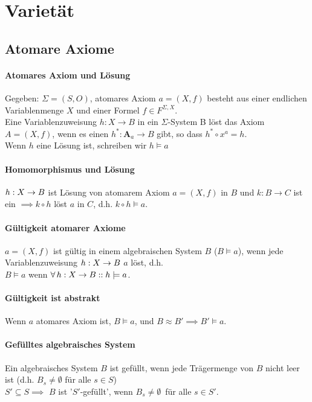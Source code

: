 \newpage

\section{Varietät}

\subsection{Atomare Axiome}

\paragraph{ Atomares Axiom und Lösung}
Gegeben: $\Sigma = (S,O)$, atomares Axiom $a = (X, f)$ besteht aus einer endlichen Variablenmenge $X$ und einer Formel $f \in F^{\Sigma, X}$. \\
Eine Variablenzuweisung $h: X \rightarrow B$ in ein $\Sigma$-System B löst das Axiom $A = (X, f)$, wenn es einen \homo $h^*: \mathbf{A}_a \rightarrow B$ gibt, so dass $h^* \circ x^a = h$. \\
Wenn $h$ eine Lösung ist, schreiben wir $h \models a$

\paragraph{ Homomorphismus und Lösung}

$h: X \rightarrow B$ ist Lösung von atomarem Axiom $a = (X,f)$ in $B$ und $k: B \rightarrow C$ ist ein \homo $\implies k \circ h$ löst $a$ in $C$, d.h. $k \circ h \models a$.


\paragraph{ Gültigkeit atomarer Axiome}

$a= (X,f) $ ist gültig in einem algebraischen System $B$ ($B \models a$), wenn jede Variablenzuweisung $h: X \rightarrow B$ $a$ löst, d.h. \\
$B \models a$ wenn $\forall \, h: X \rightarrow B :: h \models a$.

\paragraph{ Gültigkeit ist abstrakt}
Wenn $a$ atomares Axiom ist, $B \models a$, und $B \approx B' \implies B' \models a$.  

\paragraph{ Gefülltes algebraisches System}
Ein  algebraisches System $B$ ist gefüllt, wenn jede Trägermenge von $B$ nicht leer ist (d.h. 
$B_s \neq \emptyset$ für alle $s \in S$) \\ $S' \subseteq S \implies$ $B$ ist '$S'$-gefüllt', wenn $B_{s} \neq \emptyset \,$ für alle $s \in S'$.  


